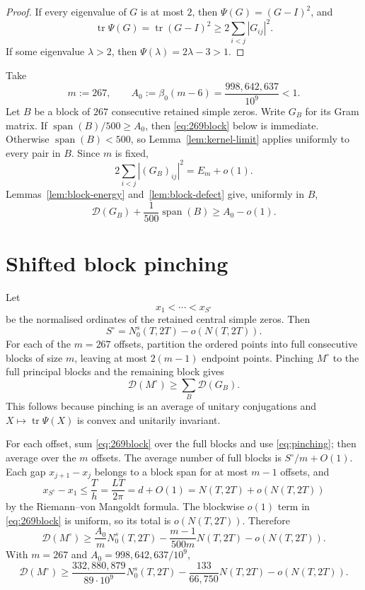 \documentclass[11pt]{article}
\DeclareMathOperator{\tr}{tr}
\newcommand{\cD}{\mathcal D}
\begin{document}
\begin{proof}
If every eigenvalue of $G$ is at most $2$, then
$\Psi(G)=(G-I)^2$, and
\[
 \tr\Psi(G)=\tr(G-I)^2\ge2\sum_{i<j}|G_{ij}|^2.
\]
If some eigenvalue $\lambda>2$, then $\Psi(\lambda)=2\lambda-3>1$.
\end{proof}

Take
\begin{equation}\label{eq:mA}
 m:=267,
 \qquad
 A_0:=\beta_0(m-6)=\frac{998{,}642{,}637}{10^{9}}<1.
\end{equation}
Let $B$ be a block of $267$ consecutive retained simple zeros.  Write $G_B$
for its Gram matrix.  If $\operatorname{span}(B)/500\ge A_0$, then
\eqref{eq:269block} below is immediate.  Otherwise
$\operatorname{span}(B)<500$, so Lemma~\ref{lem:kernel-limit} applies
uniformly to every pair in $B$.  Since $m$ is fixed,
\[
 2\sum_{i<j}|(G_B)_{ij}|^2=E_m+o(1).
\]
Lemmas~\ref{lem:block-energy} and~\ref{lem:block-defect} give, uniformly in
$B$,
\begin{equation}\label{eq:269block}
 \cD(G_B)+\frac1{500}\operatorname{span}(B)
 \ge A_0-o(1).
\end{equation}

\section{Shifted block pinching}

Let
\[
 x_1<\cdots<x_{S^\circ}
\]
be the normalised ordinates of the retained central simple zeros.  Then
\begin{equation}\label{eq:Scentral}
 S^\circ=N_0^s(T,2T)-o(N(T,2T)).
\end{equation}
For each of the $m=267$ offsets, partition the ordered points into full
consecutive blocks of size $m$, leaving at most $2(m-1)$ endpoint points.
Pinching $M^\circ$ to the full principal blocks and the remaining block gives
\begin{equation}\label{eq:pinching}
 \cD(M^\circ)\ge\sum_B\cD(G_B).
\end{equation}
This follows because pinching is an average of unitary conjugations and
$X\mapsto\tr\Psi(X)$ is convex and unitarily invariant.

For each offset, sum \eqref{eq:269block} over the full blocks and use
\eqref{eq:pinching}; then average over the $m$ offsets.  The average number of
full blocks is $S^\circ/m+O(1)$.  Each gap $x_{j+1}-x_j$ belongs to a block
span for at most $m-1$ offsets, and
\[
 x_{S^\circ}-x_1
 \le\frac{T}{h}
 =\frac{LT}{2\pi}
 =d+O(1)
 =N(T,2T)+o(N(T,2T))
\]
by the Riemann--von Mangoldt formula.  The blockwise $o(1)$ term in
\eqref{eq:269block} is uniform, so its total is $o(N(T,2T))$.  Therefore
\begin{equation}\label{eq:defect-global}
 \cD(M^\circ)
 \ge \frac{A_0}{m}N_0^s(T,2T)
 -\frac{m-1}{500m}N(T,2T)-o(N(T,2T)).
\end{equation}
With $m=267$ and $A_0=998{,}642{,}637/10^{9}$,
\begin{equation}\label{eq:defect-numbers}
 \cD(M^\circ)
 \ge
 \frac{332{,}880{,}879}{89\cdot10^{9}}N_0^s(T,2T)
 -\frac{133}{66{,}750}N(T,2T)-o(N(T,2T)).
\end{equation}
\end{document}
